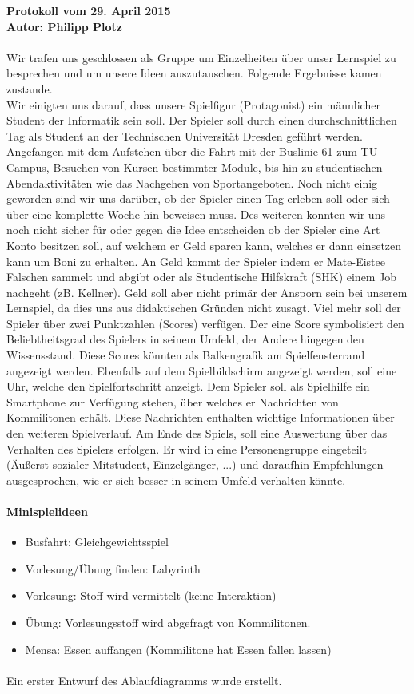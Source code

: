 \documentclass[a4paper,10pt]{article}
\begin{document}
{\bfseries \large Protokoll vom 29. April 2015 \\[1mm]		%
\normalfont Autor: Philipp Plotz}					%

\paragraph{}
Wir trafen uns geschlossen als Gruppe um Einzelheiten über unser Lernspiel zu besprechen und um unsere Ideen auszutauschen. Folgende Ergebnisse kamen zustande.\\
Wir einigten uns darauf, dass unsere Spielfigur (Protagonist) ein männlicher Student der Informatik sein soll. Der Spieler soll durch einen durchschnittlichen Tag als Student an der Technischen Universität Dresden geführt werden. Angefangen mit dem Aufstehen über die Fahrt mit der Buslinie 61 zum TU Campus, Besuchen von Kursen bestimmter Module, bis hin zu studentischen Abendaktivitäten wie das Nachgehen von Sportangeboten. Noch nicht einig geworden sind wir uns darüber, ob der Spieler einen Tag erleben soll oder sich über eine komplette Woche hin beweisen muss. Des weiteren konnten wir uns noch nicht sicher für oder gegen die Idee entscheiden ob der Spieler eine Art Konto besitzen soll, auf welchem er Geld sparen kann, welches er dann einsetzen kann um Boni zu erhalten. An Geld kommt der Spieler indem er Mate-Eistee Falschen sammelt und abgibt oder als Studentische Hilfskraft (SHK) einem Job nachgeht (zB. Kellner). Geld soll aber nicht primär der Ansporn sein bei unserem Lernspiel, da dies uns aus didaktischen Gründen nicht zusagt. Viel mehr soll der Spieler über zwei Punktzahlen (Scores) verfügen. Der eine Score symbolisiert den Beliebtheitsgrad des Spielers in seinem Umfeld, der Andere hingegen den Wissensstand. Diese Scores könnten als Balkengrafik am Spielfensterrand angezeigt werden. Ebenfalls auf dem Spielbildschirm angezeigt werden, soll eine Uhr, welche den Spielfortschritt anzeigt. Dem Spieler soll als Spielhilfe ein Smartphone zur Verfügung stehen, über welches er Nachrichten von Kommilitonen erhält. Diese Nachrichten enthalten wichtige Informationen über den weiteren Spielverlauf. Am Ende des Spiels, soll eine Auswertung über das Verhalten des Spielers erfolgen. Er wird in eine Personengruppe eingeteilt (Äußerst sozialer Mitstudent, Einzelgänger, ...) und daraufhin Empfehlungen ausgesprochen, wie er sich besser in seinem Umfeld verhalten könnte.\\
\paragraph{Minispielideen}
\begin{itemize}
	\item Busfahrt: Gleichgewichtsspiel
	\item Vorlesung/Übung finden: Labyrinth
	\item Vorlesung: Stoff wird vermittelt (keine Interaktion)
	\item Übung: Vorlesungsstoff wird abgefragt von Kommilitonen.
	\item Mensa: Essen auffangen (Kommilitone hat Essen fallen lassen)
\end{itemize}

\paragraph{}
Ein erster Entwurf des Ablaufdiagramms wurde erstellt.
\end{document}
